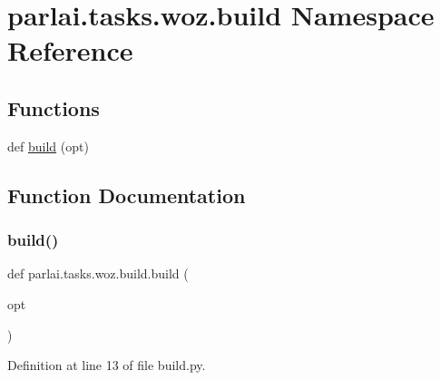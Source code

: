 \hypertarget{namespaceparlai_1_1tasks_1_1woz_1_1build}{}\section{parlai.\+tasks.\+woz.\+build Namespace Reference}
\label{namespaceparlai_1_1tasks_1_1woz_1_1build}
\subsection*{Functions}
\begin{DoxyCompactItemize}
\item 
def \hyperlink{namespaceparlai_1_1tasks_1_1woz_1_1build_ab38bcd37eac166f65dd77a51c0d8e934}{build} (opt)
\end{DoxyCompactItemize}


\subsection{Function Documentation}
\mbox{\label{namespaceparlai_1_1tasks_1_1woz_1_1build_ab38bcd37eac166f65dd77a51c0d8e934}} 
\subsubsection{\texorpdfstring{build()}{build()}}
{\footnotesize\ttfamily def parlai.\+tasks.\+woz.\+build.\+build (\begin{DoxyParamCaption}\item[{}]{opt }\end{DoxyParamCaption})}



Definition at line 13 of file build.\+py.

